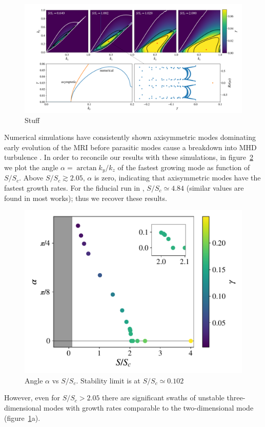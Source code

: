 \documentclass[aps,prl,reprint,superscriptaddress]{revtex4-1}
\newcommand{\SSC}{S/S_{c}}
\begin{document}
\begin{figure}[b!]
  \includegraphics[width=\textwidth]{fig_1.pdf}
  \caption{Stuff}
  \label{fig:growth_rate}
\end{figure}
\twocolumngrid
%
Numerical simulations have consistently shown axisymmetric modes dominating early evolution of the MRI before parasitic modes cause a breakdown into MHD turbulence \citep{1995ApJ...440..742H,2018ApJ...853..174H,2019ApJS..241...26D}. 
In order to reconcile our results with these simulations, in figure~\ref{fig:alpha} we plot the angle $\alpha = \arctan k_y/k_z$ of the fastest growing mode as function of $\SSC$.
Above $\SSC \gtrsim 2.05$, $\alpha$ is zero, indicating that axisymmetric modes have the fastest growth rates.
For the fiducial run in \citet{1996ApJ...464..690H}, $\SSC \simeq 4.84$ (similar values are found in most works); thus we recover these results.
%
\begin{figure}[h!]
  \includegraphics[width=\columnwidth]{alpha_vs_ssc_grid.pdf}
  \caption{Angle $\alpha$ vs $\SSC$. Stability limit is at $\SSC \simeq 0.102$}
  \label{fig:alpha}
\end{figure}
%
However, even for $\SSC> 2.05$ there are significant swaths of unstable three-dimensional modes with growth rates comparable to the two-dimensional mode (figure~\ref{fig:growth_rate}a).
\end{document}
